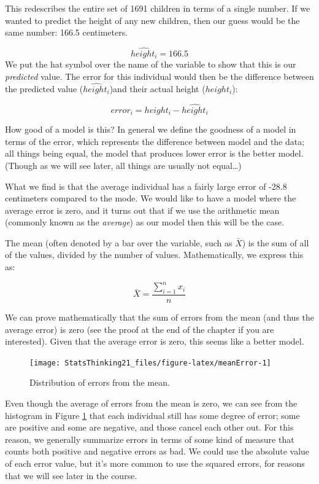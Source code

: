 \documentclass[12pt,]{book}
\theoremstyle{definition}
\theoremstyle{definition}
\theoremstyle{definition}
\theoremstyle{remark}
\begin{document}
This redescribes the entire set of 1691 children in terms of a single number. If we wanted to predict the height of any new children, then our guess would be the same number: 166.5 centimeters.

\[
\hat{height_i} = 166.5
\]
We put the hat symbol over the name of the variable to show that this is our \emph{predicted} value. The error for this individual would then be the difference between the predicted value (\(\hat{height_i}\))and their actual height (\(height_i\)):

\[
error_i = height_i - \hat{height_i}
\]

How good of a model is this? In general we define the goodness of a model in terms of the error, which represents the difference between model and the data; all things being equal, the model that produces lower error is the better model. (Though as we will see later, all things are usually not equal\ldots{})

What we find is that the average individual has a fairly large error of -28.8 centimeters compared to the mode. We would like to have a model where the average error is zero, and it turns out that if we use the arithmetic mean (commonly known as the \emph{average}) as our model then this will be the case.

The mean (often denoted by a bar over the variable, such as \(\bar{X}\)) is the sum of all of the values, divided by the number of values. Mathematically, we express this as:

\[
\bar{X} = \frac{\sum_{i=1}^{n}x_i}{n}
\]

We can prove mathematically that the sum of errors from the mean (and thus the average error) is zero (see the proof at the end of the chapter if you are interested). Given that the average error is zero, this seems like a better model.

\begin{figure}
\texttt{[image: StatsThinking21\_files/figure-latex/meanError-1]} \caption{Distribution of errors from the mean.}\label{fig:meanError}
\end{figure}

Even though the average of errors from the mean is zero, we can see from the histogram in Figure \ref{fig:meanError} that each individual still has some degree of error; some are positive and some are negative, and those cancel each other out. For this reason, we generally summarize errors in terms of some kind of measure that counts both positive and negative errors as bad. We could use the absolute value of each error value, but it's more common to use the squared errors, for reasons that we will see later in the course.
\end{document}
